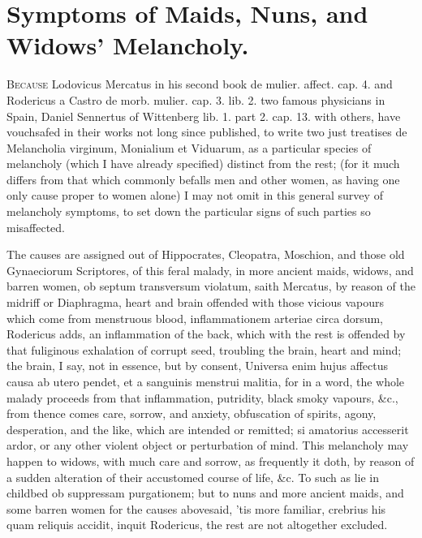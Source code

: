 {%
\section{Symptoms of Maids, Nuns, and Widows' Melancholy.}

\lettrine{B}{ecause} Lodovicus Mercatus in his second book de mulier. affect. cap.
4. and Rodericus a Castro de morb. mulier. cap. 3. lib. 2. two famous
physicians in Spain, Daniel Sennertus of Wittenberg lib. 1. part 2.
cap. 13. with others, have vouchsafed in their works not long since
published, to write two just treatises de Melancholia virginum,
Monialium et Viduarum, as a particular species of melancholy (which I
have already specified) distinct from the rest; (for it much
differs from that which commonly befalls men and other women, as having
one only cause proper to women alone) I may not omit in this general
survey of melancholy symptoms, to set down the particular signs of such
parties so misaffected.

The causes are assigned out of Hippocrates, Cleopatra, Moschion, and
those old Gynaeciorum Scriptores, of this feral malady, in more ancient
maids, widows, and barren women, ob septum transversum violatum, saith
Mercatus, by reason of the midriff or Diaphragma, heart and brain
offended with those vicious vapours which come from menstruous blood,
inflammationem arteriae circa dorsum, Rodericus adds, an inflammation
of the back, which with the rest is offended by that fuliginous
exhalation of corrupt seed, troubling the brain, heart and mind; the
brain, I say, not in essence, but by consent, Universa enim hujus
affectus causa ab utero pendet, et a sanguinis menstrui malitia, for in
a word, the whole malady proceeds from that inflammation, putridity,
black smoky vapours, \&c., from thence comes care, sorrow, and anxiety,
obfuscation of spirits, agony, desperation, and the like, which are
intended or remitted; si amatorius accesserit ardor, or any other
violent object or perturbation of mind. This melancholy may happen to
widows, with much care and sorrow, as frequently it doth, by reason of
a sudden alteration of their accustomed course of life, \&c. To such as
lie in childbed ob suppressam purgationem; but to nuns and more ancient
maids, and some barren women for the causes abovesaid, 'tis more
familiar, crebrius his quam reliquis accidit, inquit Rodericus, the
rest are not altogether excluded.

}
